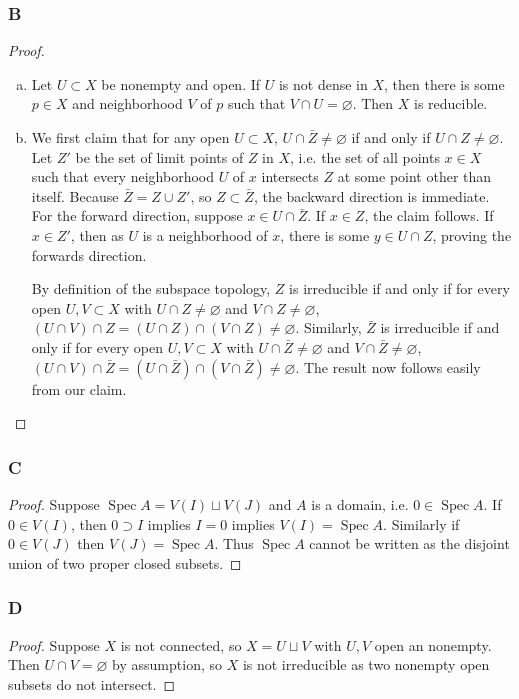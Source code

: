 \documentclass{article}
\DeclareMathOperator{\Spec}{\mathrm{Spec}}
\let\emptyset\varnothing
\begin{document}
\subsubsection{B}\label{3.6.B}
\begin{proof}
    \begin{enumerate}[(a)]
        \item Let $U\subset X$ be nonempty and open. If $U$ is not dense in $X$, then there is some $p\in X$ and neighborhood $V$ of $p$ such that $V\cap U= \emptyset$. Then $X$ is reducible.
        \item We first claim that for any open $U\subset X$, $U\cap \bar Z \ne \emptyset$ if and only if $U\cap Z \ne \emptyset$. Let $Z'$ be the set of limit points of $Z$ in $X$, i.e. the set of all points $x\in X$ such that every neighborhood $U$ of $x$ intersects $Z$ at some point other than itself. Because $\bar Z = Z\cup Z'$, so $Z\subset \bar Z$, the backward direction is immediate. For the forward direction, suppose $x\in U\cap \bar Z$. If $x\in Z$, the claim follows. If $x\in Z'$, then as $U$ is a neighborhood of $x$, there is some $y\in U\cap Z$, proving the forwards direction.

        By definition of the subspace topology, $Z$ is irreducible if and only if for every open $U,V\subset X$ with $U\cap Z\ne \emptyset$ and $V\cap Z \ne \emptyset$, $(U\cap V)\cap Z =(U\cap Z) \cap (V\cap Z)  \ne \emptyset$. Similarly, $\bar Z$ is irreducible if and only if for every open $U,V\subset X$ with $U\cap \bar Z\ne \emptyset$ and $V\cap \bar Z \ne \emptyset$, $(U\cap V)\cap \bar Z =(U\cap \bar Z) \cap (V\cap \bar Z)  \ne \emptyset$. The result now follows easily from our claim.
    \end{enumerate}
\end{proof}
\subsubsection{C}\label{3.6.C}
\begin{proof}
    Suppose $\Spec A = V(I)\sqcup V(J)$ and $A$ is a domain, i.e. $0\in \Spec A$. If $0\in V(I)$, then $0\supset I$ implies $I=0$ implies $V(I)=\Spec A$. Similarly if $0\in V(J)$ then $V(J)=\Spec A$. Thus $\Spec A$ cannot be written as the disjoint union of two proper closed subsets.
\end{proof}
\subsubsection{D}\label{3.6.D}
\begin{proof}
    Suppose $X$ is not connected, so $X=U\sqcup V$ with $U,V$ open an nonempty. Then $U\cap V=\emptyset$ by assumption, so $X$ is not irreducible as two nonempty open subsets do not intersect.
\end{proof}
\end{document}
